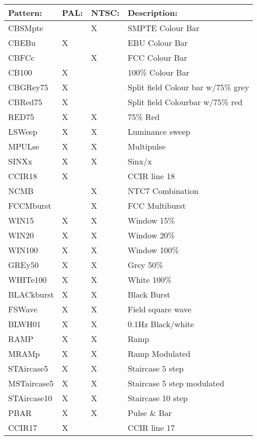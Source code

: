 \begin{tabular}{|l|l|l|l|}
\hline
\textbf{Pattern:}	& \textbf{PAL:}	& \textbf{NTSC:}	& \textbf{Description:} \\ \hline
CBSMpte		& 			&	X			& SMPTE Colour Bar \\ \hline
CBEBu			& X			& 			& EBU Colour Bar \\ \hline
CBFCc			&				& X			& FCC Colour Bar \\ \hline
CB100			& X			& 			& 100\% Colour Bar \\ \hline
CBGRey75	& X			&				& Split field Colour bar w/75\% grey \\ \hline
CBRed75		& X			&				& Split field Colourbar w/75\% red \\ \hline
RED75			& X			& X			& 75\% Red \\ \hline
LSWeep		& X			& X			& Luminance sweep \\ \hline
MPULse		& X			& X			& Multipulse \\ \hline
SINXx			& X			& X			& Sinx/x \\ \hline
CCIR18		& X			&				& CCIR line 18 \\ \hline
NCMB			& 			& X			& NTC7 Combination \\ \hline
FCCMburst	& 			& X			& FCC Multiburst \\ \hline
WIN15			& X 		& X			& Window 15\% \\ \hline
WIN20			& X			& X			& Window 20\% \\ \hline
WIN100		& X			& X			& Window 100\% \\ \hline
GREy50		& X			& X			& Grey 50\% \\ \hline
WHITe100	& X			& X			& White 100\% \\ \hline
BLACkburst& X			& X			& Black Burst \\ \hline
FSWave		& X			& X			& Field square wave \\ \hline
BLWH01		& X			& X			& 0.1Hz Black/white \\ \hline
RAMP			& X			& X			& Ramp \\ \hline
MRAMp			& X			& X 		& Ramp Modulated \\ \hline
STAircase5& X			& X			& Staircase 5 step \\ \hline
MSTaircase5& X		& X			& Staircase 5 step modulated \\ \hline
STAircase10& X		& X			& Staircase 10 step \\ \hline
PBAR			& X			& X			& Pulse \& Bar \\ \hline
CCIR17		& X 		& 			& CCIR line 17\\ \hline

\end{tabular}
